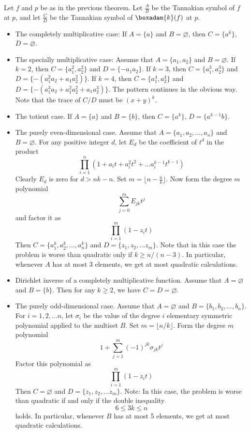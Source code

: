 \documentclass[a4paper]{article}
\begin{document}
\begin{corollary}
Let $f$ and $p$ be as in the previous theorem. Let $\frac{A}{B}$ be the Tannakian symbol of $f$ at $p$, and let $\frac{C}{D}$ be the Tannakian symbol of $\boxadam{k}(f)$ at $p$.
\begin{itemize}
\item The completely multiplicative case: If $A = \{a \}$ and $B = \varnothing$, then $C =  \{a^k \}$, $D = \varnothing$. 
\item The specially multiplicative case: Assume that $A = \{ a_1, a_2 \}$ and $B = \varnothing$. If $k=2$, then $C = \{ a_1^2, a_2^2  \}$ and $D = \{ -a_1 a_2 \}$. If $k=3$, then $C = \{ a_1^3, a_2^3  \}$ and $D = \{ -(a_1^2 a_2 + a_1 a_2^2) \}$. If $k = 4$, then $C = \{ a_1^4, a_2^4  \}$ and $D = \{ -(a_1^3 a_2 + a_1^2 a_2^2 + a_1 a_2^3) \}$. The pattern continues in the obvious way. Note that the trace of $C/D$ must be $(x+y)^k$.
\item The totient case. If $A = \{a \}$ and $B = \{b \}$, then $C =  \{a^k \}$, $D = \{   a^{k-1} b \}$. 

\item The purely even-dimensional case. Assume that $A = \{ a_1, a_2, \ldots, a_n \}$ and $B = \varnothing$. For any positive integer $d$, let $E_d$ be the coefficient of $t^d$ in the product
$$ \prod_{i=1}^n ( 1+a_i t + a_i^2 t^2 + \ldots a_i^{k-1} t^{k-1} )    $$
Clearly $E_d$ is zero for $d > nk-n$. Set $m = \lfloor n- \frac{n}{k} \rfloor$. Now form the degree $m$ polynomial
$$ \sum_{j = 0}^m E_{jk} t^j   $$
and factor it as 
$$ \prod_{i=1}^m (1-z_i t)  $$
Then $C = \{ a_1^k, a_2^k, \ldots, a_n^k \}$ and $D = \{ z_1, z_2, \ldots z_m \}$.
Note that in this case the problem is worse than quadratic only if $k \geq n / (n-3)$. In particular, whenever $A$ has at most 3 elements, we get at most quadratic calculations.

\item Dirichlet inverse of a completely multiplicative function. Assume that $A = \varnothing$ and $B = \{ b \}$. Then for any $k \geq 2$, we have $C = D = \varnothing$.

\item The purely odd-dimensional case. Assume that $A = \varnothing$ and $B = \{ b_1, b_2, \ldots, b_n \}$. For $i = 1, 2, \ldots n$, let $\sigma_i$ be the value of the degree $i$ elementary symmetric polynomial applied to the multiset $B$. Set $m = \lfloor n/k \rfloor$. Form the degree $m$ polynomial 
$$ 1+ \sum_{j=1}^{m} (-1)^{jk} \sigma_{jk} t^j   $$ 
Factor this polynomial as 
$$ \prod_{i=1}^m (1-z_i t)  $$
Then $C = \varnothing$ and $D = \{ z_1, z_2, \ldots z_m  \}$.
Note: In this case, the problem is worse than quadratic if and only if the double inequality
$$ 6 \leq 3k \leq n   $$
holds. In particular, whenever $B$ has at most 5 elements, we get at most quadratic calculations. 
\end{itemize}
\end{corollary}
\end{document}
